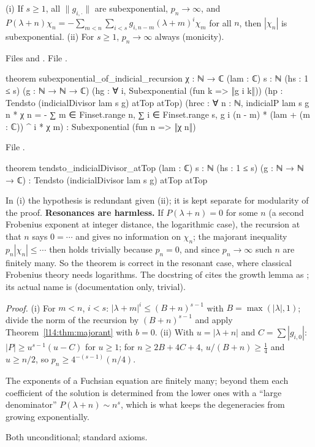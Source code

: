 \begin{theorem}\label{l14:thm:indicial}
(i) If $s\ge1$, all $\|g_{i,\cdot}\|$ are subexponential, $p_n\to\infty$, and
$P(\lambda+n)\chi_n = -\sum_{m<n}\sum_{i<s}g_{i,n-m}(\lambda+m)^i\chi_m$ for all $n$, then $|\chi_n|$ is subexponential.
(ii) For $s\ge1$, $p_n\to\infty$ always (monicity).
\end{theorem}
\noindent Files  and . File
.
\begin{leancode}
theorem subexponential_of_indicial_recursion {χ : ℕ → ℂ} (lam : ℂ) {s : ℕ} (hs : 1 ≤ s)
    (g : ℕ → ℕ → ℂ) (hg : ∀ i, Subexponential (fun k => ‖g i k‖))
    (hp : Tendsto (indicialDivisor lam s g) atTop atTop)
    (hrec : ∀ n : ℕ, indicialP lam s g n * χ n
      = - ∑ m ∈ Finset.range n, ∑ i ∈ Finset.range s,
          g i (n - m) * (lam + (m : ℂ)) ^ i * χ m) :
    Subexponential (fun n => ‖χ n‖)
\end{leancode}
\noindent File .
\begin{leancode}
theorem tendsto_indicialDivisor_atTop (lam : ℂ) {s : ℕ} (hs : 1 ≤ s) (g : ℕ → ℕ → ℂ) :
    Tendsto (indicialDivisor lam s g) atTop atTop
\end{leancode}
\begin{dictionary}
In (i) the hypothesis  is redundant given (ii); it is kept separate for modularity of the proof. \textbf{Resonances
are harmless.} If $P(\lambda+n) = 0$ for some $n$ (a second Frobenius exponent at integer distance, the logarithmic
case), the recursion at that $n$ says $0 = \cdots$ and gives no information on $\chi_n$; the majorant inequality
$p_n|\chi_n|\le\cdots$ then holds trivially because $p_n = 0$, and since $p_n\to\infty$ such $n$ are finitely many. So the theorem
is correct in the resonant case, where classical Frobenius theory needs logarithms. The docstring of
 cites the growth lemma as ; its actual name is
 (documentation only, trivial).
\end{dictionary}
\noindent\emph{Proof.} (i) For $m<n$, $i<s$: $|\lambda+m|^i\le(B+n)^{s-1}$ with $B = \max(|\lambda|,1)$; divide the norm of the
recursion by $(B+n)^{s-1}$ and apply Theorem~\ref{l14:thm:majorant} with $b=0$. (ii) With $u = |\lambda+n|$ and
$C = \sum|g_{i,0}|$: $|P|\ge u^{s-1}(u-C)$ for $u\ge1$; for $n\ge2B+4C+4$, $u/(B+n)\ge\frac14$ and $u\ge n/2$, so
$p_n\ge4^{-(s-1)}(n/4)$.
\begin{physics}
The exponents of a Fuchsian equation are finitely many; beyond them each coefficient of the solution is determined from the
lower ones with a ``large denominator'' $P(\lambda+n)\sim n^s$, which is what keeps the degeneracies from growing
exponentially.
\end{physics}
\begin{status}
Both unconditional; standard axioms.
\end{status}

